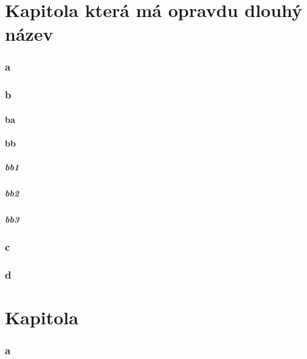 \part{Kapitola která má opravdu dlouhý název}
\lipsum[2]
\section{a}\lipsum [2]
\section{b}\lipsum
\subsection{ba}\lipsum [3]
\subsection{bb}\lipsum
\subsubsection{bb1}\lipsum [6]
\subsubsection{bb2}\lipsum
\subsubsection{bb3}\lipsum [4] 
\section{c}\lipsum
\section{d}\lipsum [1]
\clearpage
\part{Kapitola}
\lipsum[2]
\section{a}\lipsum